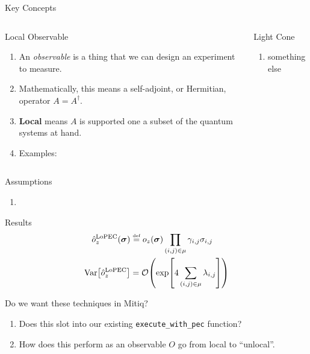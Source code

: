 \documentclass[11pt,aspectratio=1610,xcolor=dvipsnames]{beamer}
\newcommand{\defeq}{\stackrel{\text{\tiny def}}{=}}
\begin{document}
\begin{frame}{Key Concepts}
	\begin{columns}
		\begin{column}[t]{0.5\textwidth}
			{\Large Local Observable}
			\begin{enumerate}
				\item An \emph{observable} is a thing that we can design an experiment to measure.
				\item Mathematically, this means a self-adjoint, or Hermitian, operator $A = A^\dag$.
				\item \textbf{Local} means $A$ is supported one a subset of the quantum systems at hand.
				\item Examples:
			\end{enumerate}
		\end{column}
		\begin{column}[t]{0.5\textwidth}
			{\Large Light Cone}
			\begin{enumerate}
				\item something else
			\end{enumerate}
		\end{column}
	\end{columns}
\end{frame}

\begin{frame}{Assumptions}
	\begin{enumerate}
		\item
	\end{enumerate}
\end{frame}

\begin{frame}{Results}
	\begin{align*}
		\hat{o}_z^\text{LoPEC}(\boldsymbol{\sigma})      & \defeq o_z(\boldsymbol{\sigma})\prod_{(i, j) \in \mu} \gamma_{i, j}\sigma_{i, j} \\
		\operatorname{Var}\!\qty[\hat{o}_z^\text{LoPEC}] & = \order{\exp[4\sum_{(i, j) \in \mu}\lambda_{i, j}]}
	\end{align*}
\end{frame}

\begin{frame}[fragile]{Do we want these techniques in Mitiq?}
	\begin{enumerate}
		\item Does this slot into our existing \verb|execute_with_pec| function?
		\item How does this perform as an observable $O$ go from local to ``unlocal''.
	\end{enumerate}
\end{frame}
\end{document}
